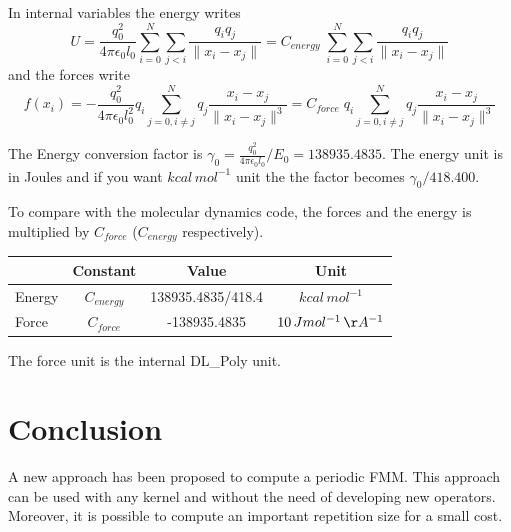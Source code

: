 \documentclass[12pt]{article} %
\begin{document}
 In internal variables the energy writes 
$$
U = \frac{q_0^2}{4 \pi\epsilon_0 l_0}\sum_{i=0}^{N}{\sum_{j<i}{\frac{q_i q_j}{\|x_i-x_j\|}}}  = C_{energy}  \;\sum_{i=0}^{N}{\sum_{j<i}{\frac{q_i q_j}{\|x_i-x_j\|}}}
$$
and the forces write 
$$
f(x_i) = -\frac{q_0^2}{4 \pi\epsilon_0 l_0^2} q_i \sum_{j=0,i\neq j}^{N}{q_j\frac{x_i-x_j}{\|x_i-x_j\|^3}}
 = C_{force} \; q_i  \sum_{j=0,i\neq j}^{N}{q_j\frac{x_i-x_j}{\|x_i-x_j\|^3}}
$$

The Energy conversion factor is $\gamma_0 = \frac{q_0^2}{4 \pi\epsilon_0 l_0}/E_0 = 138935.4835$. The energy unit is in Joules and if you want $kcal\, mol^{-1}$ unit the the factor becomes $\gamma_0/418.400$.


To compare with the molecular dynamics code, the forces and the energy is multiplied by $C_{force}$ ($C_{energy}$ respectively). 
\begin{center}
\begin{tabular}{|l|c|c|c|}
\hline
   & Constant & Value &  Unit \\
\hline
Energy & $C_{energy}$& 138935.4835/418.4 &  $kcal\, mol^{-1}$\\
Force &$C_{force}$& -138935.4835 &  $10\,J  mol^{-1}\, \AA^{-1}$\\
\hline
\end{tabular}
\end{center}
The force unit is the internal DL\_Poly unit.

\section{Conclusion}
A new approach has been proposed to compute a periodic FMM.
This approach can be used with any kernel and without the need of developing new operators.
Moreover, it is possible to compute an important repetition size for a small cost.
\end{document}
